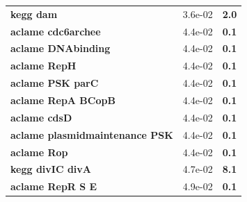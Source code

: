 \begin{landscape}
\begin{table}
{\begin{minipage}[t]{0.3\textwidth}
\begin{tabular}{>{\bfseries}p{\textwidth}cc}
\rowcolor{posit2}kegg dam&3.6e-02&\textbf{\colorbox{colorpower}{2.0}}\\
\rowcolor{posit2}aclame cdc6archee&4.4e-02&\textbf{\colorbox{colorpowernegxx}{0.1}}\\
\rowcolor{posit2}aclame DNAbinding&4.4e-02&\textbf{\colorbox{colorpowernegxx}{0.1}}\\
\rowcolor{posit2}aclame RepH&4.4e-02&\textbf{\colorbox{colorpowernegxx}{0.1}}\\
\rowcolor{posit2}aclame PSK parC&4.4e-02&\textbf{\colorbox{colorpowernegxx}{0.1}}\\
\rowcolor{posit2}aclame RepA BCopB&4.4e-02&\textbf{\colorbox{colorpowernegxx}{0.1}}\\
\rowcolor{posit2}aclame cdsD&4.4e-02&\textbf{\colorbox{colorpowernegxx}{0.1}}\\
\rowcolor{posit2}aclame plasmidmaintenance PSK&4.4e-02&\textbf{\colorbox{colorpowernegxx}{0.1}}\\
\rowcolor{posit2}aclame Rop&4.4e-02&\textbf{\colorbox{colorpowernegxx}{0.1}}\\
\rowcolor{posit2}kegg divIC divA&4.7e-02&\textbf{\colorbox{colorpowerxx}{8.1}}\\
\rowcolor{posit2}aclame RepR S E&4.9e-02&\textbf{\colorbox{colorpowernegxx}{0.1}}\\


\end{tabular}
\end{minipage}}
\end{table}
\end{landscape}
